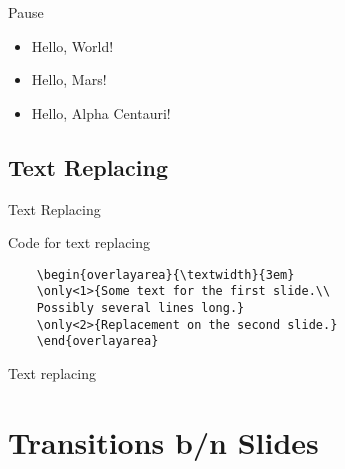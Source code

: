 \documentclass[10pt,xcolor=x11names]{beamer}
\begin{document}
\begin{frame}{Pause} \vspace{-110pt}
\pause
\begin{itemize}
	\item Hello, World!
	\pause
	\item Hello, Mars!
	\pause
	\item Hello, Alpha Centauri!
\end{itemize}

\end{frame}


\subsection{Text Replacing}
\begin{frame}[fragile]{Text Replacing} \vspace{-20pt}

\begin{exampleblock}{Code for text replacing}
	\begin{verbatim}
	\begin{overlayarea}{\textwidth}{3em}
	\only<1>{Some text for the first slide.\\
	Possibly several lines long.}
	\only<2>{Replacement on the second slide.}
	\end{overlayarea}
	\end{verbatim}	
\end{exampleblock}

\begin{block}{Text replacing}
\begin{overlayarea}{\textwidth}{3em}
\end{overlayarea}
\end{block}
\end{frame}

\section{Transitions b/n Slides}
\end{document}
